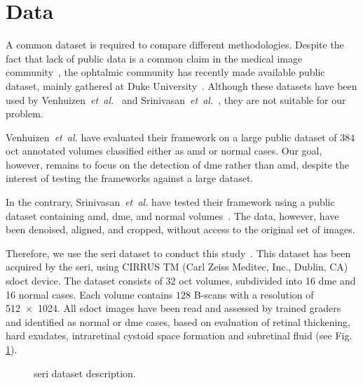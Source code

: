 \graphicspath{ {./content/method/figures/} }

\section{Data}\label{sec:data}
A common dataset is required to compare different methodologies.
Despite the fact that lack of public data is a common claim in the medical image community~\cite{giger2008anniversary}, the ophtalmic community has recently made available public dataset, mainly gathered at Duke University~\cite{farsiu2014quantitative,Srinivasan2014}.
Although these datasets have been used by Venhuizen~\emph{et~al.}~\cite{Venhuizen2015} and Srinivasan~\emph{et~al.}~\cite{Srinivasan2014}, they are not suitable for our problem.

Venhuizen~\emph{et~al.} have evaluated their framework on a large public dataset of $384$ \gls{oct} annotated volumes classified either as \gls{amd} or normal cases.
Our goal, however, remains to focus on the detection of \gls{dme} rather than \gls{amd}, despite the interest of testing the frameworks against a large dataset.

In the contrary, Srinivasan~\emph{et~al.} have tested their framework using a public dataset containing \gls{amd}, \gls{dme}, and normal volumes~\cite{Srinivasan2014}.
The data, however, have been denoised, aligned, and cropped, without access to the original set of images.

Therefore, we use the \gls{seri} dataset to conduct this study~\cite{seri2016apr-repoICPR}.
This dataset has been acquired by the \gls{seri}, using CIRRUS TM (Carl Zeiss Meditec, Inc., Dublin, CA) \gls{sdoct} device.
The dataset consists of 32 \gls{oct} volumes, subdivided into 16 \gls{dme} and 16 normal cases.
Each volume contains $128$ B-scans with a resolution of \SI[product-units=repeat]{512x1024}{\px}.
All \gls{sdoct} images have been read and assessed by trained graders and identified as normal or \gls{dme} cases, based on evaluation of retinal thickening, hard exudates, intraretinal cystoid space formation and subretinal fluid (see Fig.\,\ref{fig:bbdd}).

\begin{figure}
    \caption{\gls{seri} dataset description.}
  \label{fig:bbdd}
\end{figure}
